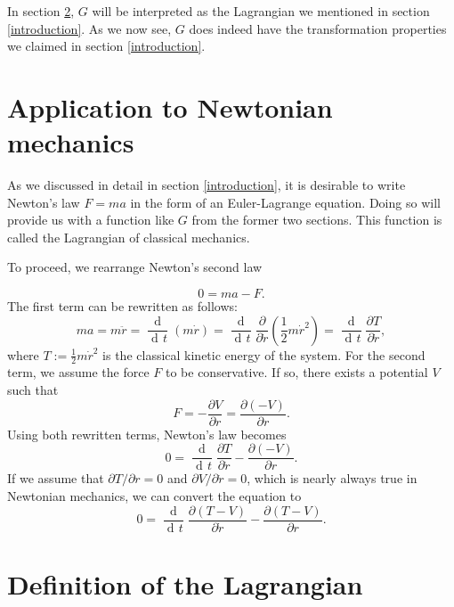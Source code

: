\documentclass[prb,preprint]{revtex4-1}
\DeclareMathOperator{\dd}{d\!}
\DeclareMathOperator{\ddd}{\mathrm{d}}
\begin{document}
In section \ref{lagrangian-def}, $G$ will be interpreted as the Lagrangian we mentioned in section \ref{introduction}. As we now see, $G$ does indeed have the transformation properties we claimed in section \ref{introduction}.

\section{Application to Newtonian mechanics} \label{application}
As we discussed in detail in section \ref{introduction}, it is desirable to write Newton's law $F=ma$ in the form of an Euler-Lagrange equation. Doing so will provide us with a function like $G$ from the former two sections. This function is called the Lagrangian of classical mechanics.

To proceed, we rearrange Newton's second law

\begin{equation}
0 = ma - F.
\end{equation}
The first term can be rewritten as follows:
\begin{equation}
ma = m \ddot{r} = \frac{\ddd}{\dd t} (m \dot{r})
= \frac{\ddd}{\dd t} \frac{\partial}{\partial \dot{r}} \left(\frac{1}{2} m \dot{r}^2 \right)
= \frac{\ddd}{\dd t} \frac{\partial T}{\partial \dot{r}},
\end{equation}
where $T:=\frac{1}{2} m \dot{r}^2$ is the classical kinetic energy of the system. For the second term, we assume the force $F$ to be conservative. If so, there exists a potential $V$ such that
\begin{equation}
F = - \frac{\partial V}{\partial r} = \frac{\partial (-V)}{\partial r}.
\end{equation}
Using both rewritten terms, Newton's law becomes
\begin{equation}
0 = \frac{\ddd}{\dd t} \frac{\partial T}{\partial \dot{r}} - \frac{\partial (-V)}{\partial r}.
\end{equation}
If we assume that $\partial T/ \partial r = 0$ and $\partial V / \partial \dot{r} = 0$, which is nearly always true in Newtonian mechanics, we can convert the equation to
\begin{equation}
0 = \frac{\ddd}{\dd t} \frac{\partial (T-V)}{\partial \dot{r}} - \frac{\partial (T-V)}{\partial r}.
\end{equation}

\section{Definition of the Lagrangian}\label{lagrangian-def} %
\end{document}

